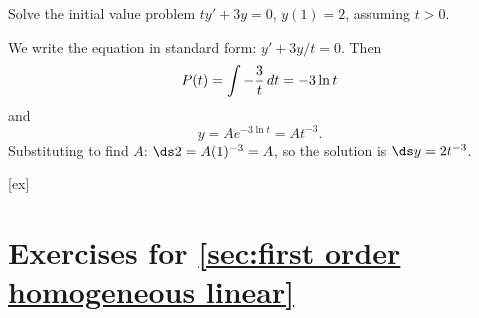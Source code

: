 \begin{example}{}{}\label{}
 Solve the initial value problem $ty'+3y=0$, $y(1)=2$,
assuming $t>0$.
\end{example}

\begin{solution}
We write the equation in standard form: $y'+3y/t=0$. Then
$$P(t)=\int -{3\over t}\,dt=-3\ln t$$
and 
$$ y=Ae^{-3\ln t}=At^{-3}.$$
Substituting to find $A$:
$\ds 2=A(1)^{-3}=A$, so the solution is $\ds y=2t^{-3}$.
\end{solution}


[ex]
\section*{Exercises for \ref{sec:first order homogeneous linear}}

